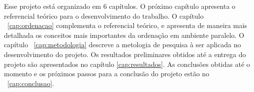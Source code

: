 Esse projeto está organizado em 6 capítulos. O próximo capítulo apresenta o referencial teórico para o desenvolvimento do trabalho. %
O capítulo ~\ref{cap:ordenacao} complementa o referencial teórico, e apresenta de maneira mais detalhada os conceitos mais importantes da ordenação em ambiente paralelo.
O capítulo ~\ref{cap:metodologia} descreve a metologia de pesquisa à ser aplicada no desenvolvimento do projeto. Os resultados preliminares obtidos até a entrega do projeto são apresentados no capítulo \ref{cap:resultados}. As conclusões obtidas até o momento e os próximos passos para a conclusão do projeto estão no ~\ref{cap:conclusao}.







